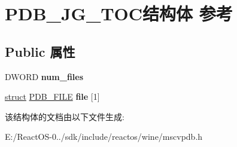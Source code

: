 \hypertarget{struct_p_d_b___j_g___t_o_c}{}\section{P\+D\+B\+\_\+\+J\+G\+\_\+\+T\+O\+C结构体 参考}
\label{struct_p_d_b___j_g___t_o_c}
\subsection*{Public 属性}
\begin{DoxyCompactItemize}
\item 
\mbox{\label{struct_p_d_b___j_g___t_o_c_a6369fc2676c6e6adf5c18c429ed91bd8}} 
D\+W\+O\+RD {\bfseries num\+\_\+files}
\item 
\mbox{\label{struct_p_d_b___j_g___t_o_c_abf5b2b4e34062bf4c0c87201456bdd1b}} 
\hyperlink{interfacestruct}{struct} \hyperlink{struct_p_d_b___f_i_l_e}{P\+D\+B\+\_\+\+F\+I\+LE} {\bfseries file} \mbox{[}1\mbox{]}
\end{DoxyCompactItemize}


该结构体的文档由以下文件生成\+:\begin{DoxyCompactItemize}
\item 
E\+:/\+React\+O\+S-\/0../sdk/include/reactos/wine/mscvpdb.\+h\end{DoxyCompactItemize}
